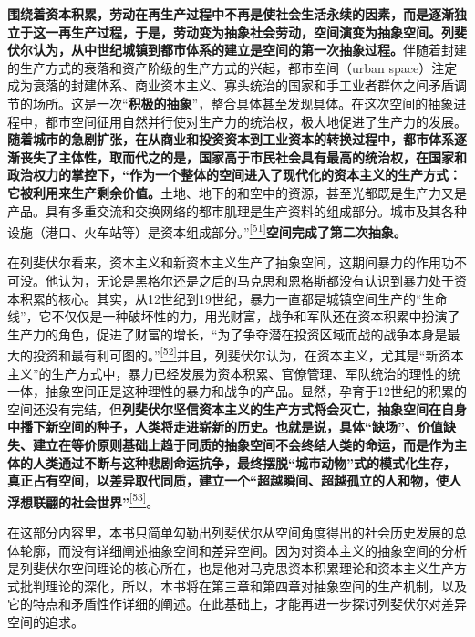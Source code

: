 \documentclass[UTF8, fontset = sourcesans, a4paper, oneside, zihao =
-4, scheme=chinese, no-math, space=true]{ctexbook}
\begin{document}
\textbf{围绕着资本积累，劳动在再生产过程中不再是使社会生活永续的因素，而是逐渐独立于这一再生产过程，于是，劳动变为抽象社会劳动，空间演变为抽象空间。列斐伏尔认为，从中世纪城镇到都市体系的建立是空间的第一次抽象过程。}伴随着封建的生产方式的衰落和资产阶级的生产方式的兴起，都市空间（urban
space）注定成为衰落的封建体系、商业资本主义、寡头统治的国家和手工业者群体之间矛盾调节的场所。这是一次``\textbf{积极的抽象}''，整合具体甚至发现具体。在这次空间的抽象进程中，都市空间征用自然并行使对生产力的统治权，极大地促进了生产力的发展。\textbf{随着城市的急剧扩张，在从商业和投资资本到工业资本的转换过程中，都市体系逐渐丧失了主体性，取而代之的是，国家高于市民社会具有最高的统治权，在国家和政治权力的掌控下，``作为一个整体的空间进入了现代化的资本主义的生产方式：它被利用来生产剩余价值。}土地、地下的和空中的资源，甚至光都既是生产力又是产品。具有多重交流和交换网络的都市肌理是生产资料的组成部分。城市及其各种设施（港口、火车站等）是资本组成部分。''\protect\hypertarget{part0006_split_003.htmlux5cux23w51}{}{}\protect\hyperlink{part0006_split_003.htmlux5cux23m51}{\textsuperscript{{[}51{]}}}\textbf{空间完成了第二次抽象。}

在列斐伏尔看来，资本主义和新资本主义生产了抽象空间，这期间暴力的作用功不可没。他认为，无论是黑格尔还是之后的马克思和恩格斯都没有认识到暴力处于资本积累的核心。其实，从12世纪到19世纪，暴力一直都是城镇空间生产的``生命线''，它不仅仅是一种破坏性的力，用光财富，战争和军队还在资本积累中扮演了生产力的角色，促进了财富的增长，``为了争夺潜在投资区域而战的战争本身是最大的投资和最有利可图的。''\protect\hypertarget{part0006_split_003.htmlux5cux23w52}{}{}\protect\hyperlink{part0006_split_003.htmlux5cux23m52}{\textsuperscript{{[}52{]}}}并且，列斐伏尔认为，在资本主义，尤其是``新资本主义''的生产方式中，暴力已经发展为资本积累、官僚管理、军队统治的理性的统一体，抽象空间正是这种理性的暴力和战争的产品。显然，孕育于12世纪的积累的空间还没有完结，但\textbf{列斐伏尔坚信资本主义的生产方式将会灭亡，抽象空间在自身中播下新空间的种子，人类将走进崭新的历史。也就是说，具体``缺场''、价值缺失、建立在等价原则基础上趋于同质的抽象空间不会终结人类的命运，而是作为主体的人类通过不断与这种悲剧命运抗争，最终摆脱``城市动物''式的模式化生存，真正占有空间，以差异取代同质，建立一个``超越瞬间、超越孤立的人和物，使人浮想联翩的社会世界''}\protect\hypertarget{part0006_split_003.htmlux5cux23w53}{}{}\protect\hyperlink{part0006_split_003.htmlux5cux23m53}{\textsuperscript{{[}53{]}}}。

在这部分内容里，本书只简单勾勒出列斐伏尔从空间角度得出的社会历史发展的总体轮廓，而没有详细阐述抽象空间和差异空间。因为对资本主义的抽象空间的分析是列斐伏尔空间理论的核心所在，也是他对马克思资本积累理论和资本主义生产方式批判理论的深化，所以，本书将在第三章和第四章对抽象空间的生产机制，以及它的特点和矛盾性作详细的阐述。在此基础上，才能再进一步探讨列斐伏尔对差异空间的追求。
\end{document}
